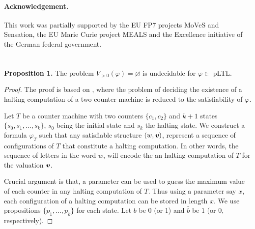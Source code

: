 \documentclass{llncs}
\renewcommand{\emptyset}{\varnothing}
\renewcommand{\a}[1]{\textbf{\textit{#1}}}
\newcommand{\ve}{{{\a v}}}
\begin{document}
\paragraph*{Acknowledgement.}
This work was partially supported by the EU FP7 projects MoVeS and Sensation,  the EU Marie Curie project MEALS and the Excellence initiative of the German federal government.


  
 \newpage
\appendix
 \section{} 
 \textbf{Proposition 1.} The problem $V_{>0} (\varphi)=\emptyset$ is undecidable for $\varphi \in$ pLTL.
 \begin{proof}
The proof is based on  \cite[Th.\ 4.1]{DBLP:journals/tocl/AlurETP01}, 
where the problem of deciding the existence of a halting computation of a two-counter machine is reduced to the satisfiability of $\varphi$. 

Let $T$ be a counter machine with two counters $\{c_1,c_2\}$ and $k+1$ states $\{s_0,s_1,\hdots,s_k\}$, $s_0$ being the initial state and $s_k$ the 
halting state. We construct a formula $\varphi_T$ such that any satisfiable structure $(w,\ve)$, represent a sequence of configurations of $T$ that constitute
a halting computation. In other words, the sequence of letters in the word $w$, will encode the an halting computation of $T$ for the valuation $\ve$.

 Crucial argument is that, a parameter  
can be used to guess the maximum value of each counter in any halting computation of $T$. Thus using a parameter say $x$, each configuration of
a halting computation can be stored in length $x$. We use propositions $\{p_1,\hdots,p_k\}$ for each state.
Let $b$ be $0$ (or $1$) and $\bar b$ be $1$ (or $0$, respectively).  


\end{proof}
\end{document}
